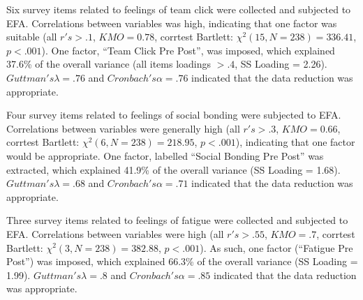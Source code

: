 



Six survey items related to feelings of team click were collected and subjected to EFA. Correlations between variables was high, indicating that one factor was suitable (all $r's > .1$, $KMO = 0.78$, corrtest Bartlett: $\chi^2(15, N = 238) = 336.41$, $p < .001$).  One factor, ``Team Click Pre Post'', was imposed, which explained 37.6\% of the overall variance (all items loadings $> .4$, SS Loading = 2.26).  $Guttman's \lambda =.76$ and $Cronbach's \alpha = .76$ indicated that the data reduction was appropriate.

Four survey items related to feelings of social bonding were subjected to EFA. Correlations between variables were generally high (all $r's > .3$, $KMO = 0.66$, corrtest Bartlett: $\chi^2(6, N = 238) = 218.95$, $p < .001$), indicating that one factor would be appropriate.  One factor, labelled ``Social Bonding Pre Post'' was extracted, which explained 41.9\% of the overall variance (SS Loading = 1.68).  $Guttman's \lambda =.68$ and $Cronbach's \alpha = .71$ indicated that the data reduction was appropriate.

Three survey items related to feelings of fatigue  were collected and subjected to EFA.
Correlations between variables were high (all $r's > .55$, $KMO = .7$, corrtest Bartlett: $\chi^2(3, N = 238) = 382.88$, $p < .001$).  As such, one factor (``Fatigue Pre Post'') was imposed, which explained 66.3\% of the overall variance (SS Loading = 1.99).  $Guttman's \lambda =.8$ and $Cronbach's \alpha = .85$ indicated that the data reduction was appropriate.









